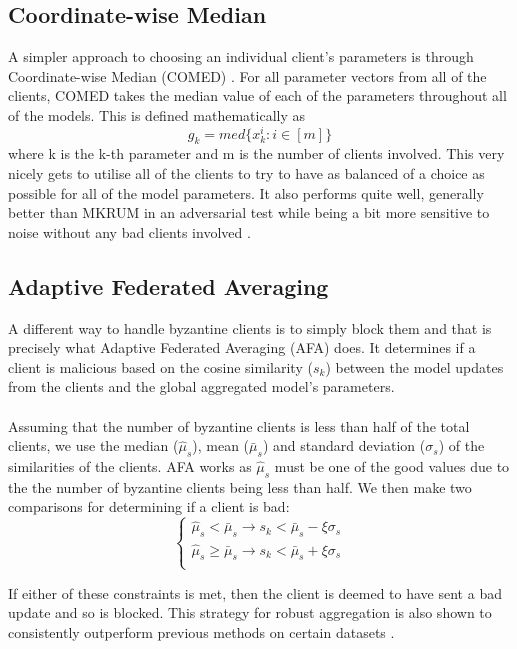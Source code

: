 \subsection{Coordinate-wise Median}
A simpler approach to choosing an individual client's parameters is through Coordinate-wise Median (COMED) \cite{comed}.
For all parameter vectors from all of the clients, COMED takes the median value of each of the parameters throughout all of the models.
This is defined mathematically as
\begin{equation}
    g_k = med\{x_k^i: i \in [m]\}
\end{equation}
where k is the k-th parameter and m is the number of clients involved.
This very nicely gets to utilise all of the clients to try to have as balanced of a choice as possible for all of the model parameters.
It also performs quite well, generally better than MKRUM in an adversarial test while being a bit more sensitive to noise without any bad clients involved \cite{robagg_health}.

\subsection{Adaptive Federated Averaging}
A different way to handle byzantine clients is to simply block them and that is precisely what Adaptive Federated Averaging (AFA) \cite{afa} does.
It determines if a client is malicious based on the cosine similarity ($s_k$) between the model updates from the clients and the global aggregated model's parameters. \\ \\
Assuming that the number of byzantine clients is less than half of the total clients, we use the median ($\hat{\mu}_s$), mean ($\bar{\mu}_s$) and standard deviation ($\sigma_s$) of the similarities of the clients. AFA works as $\hat{\mu}_s$ must be one of the good values due to the the number of byzantine clients being less than half. We then make two comparisons for determining if a client is bad:
\begin{equation}
    \begin{cases}
      \hat{\mu}_s < \bar{\mu}_s \longrightarrow s_k < \bar{\mu}_s - \xi \sigma_s\\
      \hat{\mu}_s \geq \bar{\mu}_s \longrightarrow s_k < \bar{\mu}_s + \xi \sigma_s\\
    \end{cases}
\end{equation}

If either of these constraints is met, then the client is deemed to have sent a bad update and so is blocked.
This strategy for robust aggregation is also shown to consistently outperform previous methods on certain datasets \cite{robagg_health}.

